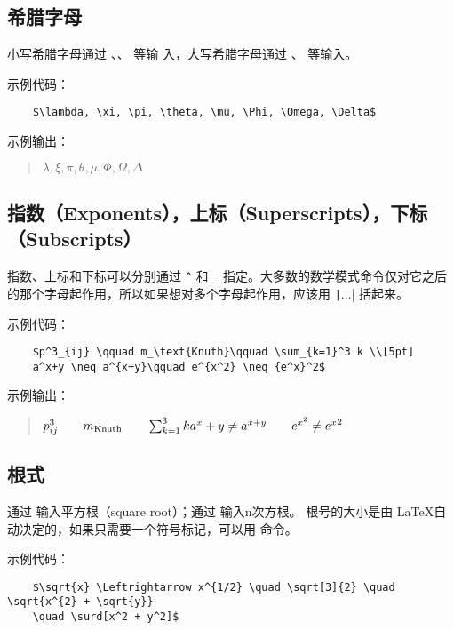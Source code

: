 \documentclass[UTF8]{ctexart}
\begin{document}
\subsection{希腊字母}
小写希腊字母通过 \texttt{\alpha}、\texttt{\beta}、\texttt{\gamma} 等输
入，大写希腊字母通过 \texttt{\Gamma}、\texttt{\Delta} 等输入。

示例代码：
\begin{verbatim}
    $\lambda, \xi, \pi, \theta, \mu, \Phi, \Omega, \Delta$
\end{verbatim}

示例输出：
\begin{quote}
    $\lambda, \xi, \pi, \theta, \mu, \Phi, \Omega, \Delta$
\end{quote}

\subsection{指数（Exponents），上标（Superscripts），下标（Subscripts）}
指数、上标和下标可以分别通过 \texttt{^} 和 \texttt{_} 指定。大多数的数学模式命令仅对它之后
的那个字母起作用，所以如果想对多个字母起作用，应该用 \texttt|{...}| 括起来。

示例代码：
\begin{verbatim}
    $p^3_{ij} \qquad m_\text{Knuth}\qquad \sum_{k=1}^3 k \\[5pt]
    a^x+y \neq a^{x+y}\qquad e^{x^2} \neq {e^x}^2$
\end{verbatim}

示例输出：
\begin{quote}
    $p^3_{ij} \qquad m_\text{Knuth}\qquad \sum_{k=1}^3 k \\[5pt]
    a^x+y \neq a^{x+y}\qquad e^{x^2} \neq {e^x}^2$
\end{quote}

\subsection{根式}
通过 \texttt{\sqrt} 输入平方根（square root）；通过 \texttt{\sqrt[n]} 输入n次方根。
根号的大小是由 \LaTeX 自动决定的，如果只需要一个符号标记，可以用 \texttt{\surd} 命令。

示例代码：
\begin{verbatim}
    $\sqrt{x} \Leftrightarrow x^{1/2} \quad \sqrt[3]{2} \quad \sqrt{x^{2} + \sqrt{y}}
    \quad \surd[x^2 + y^2]$
\end{verbatim}
\end{document}
